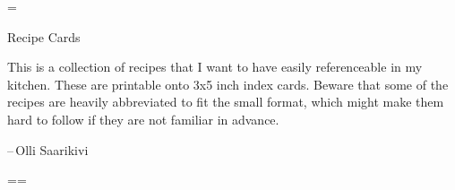 \documentclass{article}
\newenvironment{recipe}[3][]
    {\begin{cardbase}[#1]{#2}{#3}
    \columnratio{0.333}
    \begin{paracol}{2}}
    {\end{paracol}\end{cardbase}}
\newcommand{\nextcolumn}{\switchcolumn}
\newenvironment{ingredients}
    {
    \begin{obeylines}
    \vspace{\parskip}
    \setlength{\parskip}{0.25em}
    \vspace{-0.25em}
    \leftskip=1em
    \parindent=-1em}
    {\end{obeylines}}
\newenvironment{steps}
    {\begin{enumerate}[leftmargin=*,topsep=0pt]}
    {\end{enumerate}}
\newcommand{\tag}[1]{\hspace{1em}#1}
\newcommand{\symboltag}[2]{\tag{#1\hspace{0.3em}#2}}
\newcommand{\totaltime}[1]{\symboltag{\raisebox{-0.09em}{\small\texttt{[image: symbols/stopwatch.pdf]}}}{#1}}
\newcommand{\preheat}[1]{\symboltag{\raisebox{-0.09em}{\texttt{[image: symbols/oven.pdf]}}}{#1}}
\begin{document}
\clearpage
\edef\hmm{\pdfpagewidth=\the\pdfpagewidth \pdfpageheight=\the\pdfpageheight\relax}
\newlength{\tocmargin}
\setlength{\tocmargin}{0.3in}
\newlength{\tocheight}
\setlength{\tocheight}{6.471in}
\newlength{\toctextheight}
\setlength{\toctextheight}{\tocheight-2\tocmargin}
\pdfpagewidth=5in
\pdfpageheight=\tocheight
{}
\begin{center}
    \Large\rmfamily Recipe Cards
\end{center}
\vspace{0.5em}

{\scriptsize
This is a collection of recipes that I want to have easily referenceable in my kitchen. These are printable onto 3x5 inch index cards. Beware that some of the recipes are heavily abbreviated to fit the small format, which might make them hard to follow if they are not familiar in advance.

--\,Olli Saarikivi

\begin{multicols}{2}
    \raggedcolumns
    \tableofcontents
\end{multicols}
}
\restoregeometry
\hmm






















\iffalse

\begin{recipe}{}{\tag{}\preheat{}\totaltime{}}
\begin{ingredients}
\end{ingredients}
\nextcolumn
Serves
\begin{steps}
    \item
\end{steps}
\end{recipe}

\fi
\end{document}
